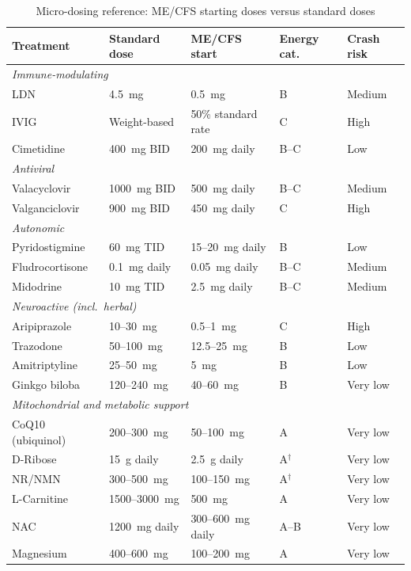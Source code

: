 \begin{table}[htbp]
\centering
\caption{Micro-dosing reference: ME/CFS starting doses versus standard doses}
\label{tab:microdosing-reference}
\small
\begin{tabular}{@{}lllll@{}}
\toprule
\textbf{Treatment} & \textbf{Standard dose} & \textbf{ME/CFS start} & \textbf{Energy cat.} & \textbf{Crash risk} \\
\midrule
\multicolumn{5}{l}{\textit{Immune-modulating}} \\
LDN & 4.5~mg & 0.5~mg & B & Medium \\
IVIG & Weight-based & 50\% standard rate & C & High \\
Cimetidine & 400~mg BID & 200~mg daily & B--C & Low \\
\midrule
\multicolumn{5}{l}{\textit{Antiviral}} \\
Valacyclovir & 1000~mg BID & 500~mg daily & B--C & Medium \\
Valganciclovir & 900~mg BID & 450~mg daily & C & High \\
\midrule
\multicolumn{5}{l}{\textit{Autonomic}} \\
Pyridostigmine & 60~mg TID & 15--20~mg daily & B & Low \\
Fludrocortisone & 0.1~mg daily & 0.05~mg daily & B--C & Medium \\
Midodrine & 10~mg TID & 2.5~mg daily & B--C & Medium \\
\midrule
\multicolumn{5}{l}{\textit{Neuroactive (incl.\ herbal)}} \\
Aripiprazole & 10--30~mg & 0.5--1~mg & C & High \\
Trazodone & 50--100~mg & 12.5--25~mg & B & Low \\
Amitriptyline & 25--50~mg & 5~mg & B & Low \\
Ginkgo biloba & 120--240~mg & 40--60~mg & B & Very low \\
\midrule
\multicolumn{5}{l}{\textit{Mitochondrial and metabolic support}} \\
CoQ10 (ubiquinol) & 200--300~mg & 50--100~mg & A & Very low \\
D-Ribose & 15~g daily & 2.5~g daily & A$^\dagger$ & Very low \\
NR/NMN & 300--500~mg & 100--150~mg & A$^\dagger$ & Very low \\
L-Carnitine & 1500--3000~mg & 500~mg & A & Very low \\
NAC & 1200~mg daily & 300--600~mg daily & A--B & Very low \\
Magnesium & 400--600~mg & 100--200~mg & A & Very low \\
\bottomrule
\end{tabular}


\end{table}
